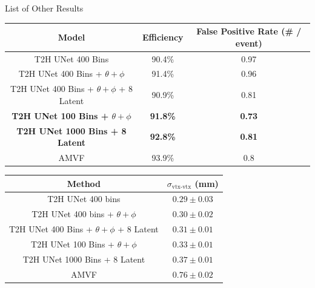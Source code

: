 \documentclass[xcolor=table,aspectratio=169]{beamer}
\begin{document}
\begin{frame}{List of Other Results}
    \centering
    \begin{tabular}{c c c}
        \hline
        Model & Efficiency & False Positive Rate (\# / event) \\
        \hline
        T2H UNet 400 Bins & 90.4\% & 0.97 \\
        T2H UNet 400 Bins + \(\theta + \phi\) & 91.4\% & 0.96 \\
        T2H UNet 400 Bins + \(\theta + \phi\) + 8 Latent & 90.9\% & 0.81 \\
        \textbf{T2H UNet 100 Bins + \(\theta + \phi\)} & \textbf{91.8\%} & \textbf{0.73} \\
        \textbf{T2H UNet 1000 Bins + 8 Latent} & \textbf{92.8\%} & \textbf{0.81} \\
        AMVF & 93.9\% & 0.8 \\
        \hline
    \end{tabular}

    \vspace{7pt}

    \begin{tabular}{c c}
        \hline
        Method & \(\sigma_{\text{vtx-vtx}}\) (mm) \\
        \hline
        T2H UNet 400 bins & \(0.29 \pm 0.03\) \\
        T2H UNet 400 bins + \(\theta + \phi\) & \(0.30 \pm 0.02\) \\
        T2H UNet 400 Bins + \(\theta + \phi\) + 8 Latent & \(0.31 \pm 0.01\) \\
        T2H UNet 100 Bins + \(\theta + \phi\) & \(0.33 \pm 0.01\) \\
        T2H UNet 1000 Bins + 8 Latent & \(0.37 \pm 0.01\) \\
        AMVF & \(0.76 \pm 0.02\) \\
        \hline
    \end{tabular}
\end{frame}
\end{document}
